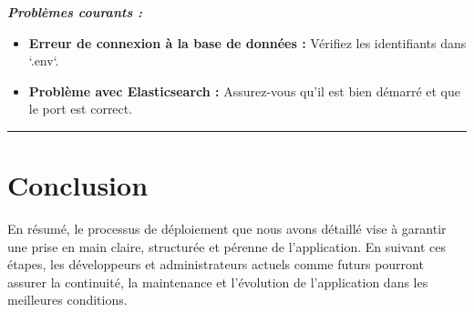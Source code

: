 \documentclass[12pt]{article}
\begin{document}
{\fontsize{14}{16}\textbf{\textit{Problèmes courants :}}}

\begin{itemize}
    \item \textbf{Erreur de connexion à la base de données :} Vérifiez les identifiants dans `.env`.
    \item \textbf{Problème avec Elasticsearch :} Assurez-vous qu’il est bien démarré et que le port est correct.
\end{itemize}
\rule{\linewidth}{0.2pt}

\newpage
{\fontsize{14}{16}\section*{Conclusion}}
En résumé, le processus de déploiement que nous avons détaillé vise à garantir une prise en main claire, structurée 
et pérenne de l'application. En suivant ces étapes, les développeurs et administrateurs actuels comme futurs pourront
assurer la continuité, la maintenance et l’évolution de l’application dans les meilleures conditions.
\end{document}
